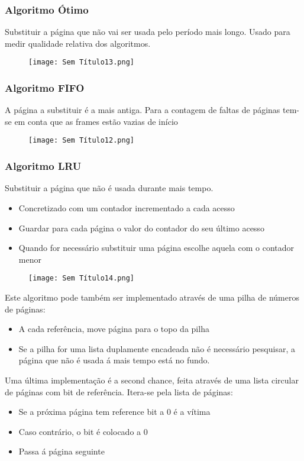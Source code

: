 \documentclass[10pt,a4paper]{report}
\begin{document}
\subsubsection{Algoritmo Ótimo}
Substituir a página que não vai ser usada pelo período mais longo. Usado para medir qualidade relativa dos algoritmos.
\begin{figure}[H]
\centering
\texttt{[image: Sem Título13.png]}
\end{figure}
\subsubsection{Algoritmo FIFO}
A página a substituir é a mais antiga. Para a contagem de faltas de páginas tem-se em conta que as frames estão vazias de início
\begin{figure}[H]
\centering
\texttt{[image: Sem Título12.png]}
\end{figure}
\subsubsection{Algoritmo LRU}
Substituir a página que não é usada durante mais tempo.
\begin{itemize}
\item Concretizado com um contador incrementado a cada acesso
\item Guardar para cada página o valor do contador do seu último acesso
\item Quando for necessário substituir uma página escolhe aquela com o contador menor
\end{itemize}
\begin{figure}[H]
\centering
\texttt{[image: Sem Título14.png]}
\end{figure}
Este algoritmo pode também ser implementado através de uma pilha de números de páginas:
\begin{itemize}
\item A cada referência, move página para o topo da pilha
\item Se a pilha for uma lista duplamente encadeada não é necessário pesquisar, a página que não é usada á mais tempo está no fundo.
\end{itemize}
Uma última implementação é a second chance, feita através de uma lista circular de páginas com bit de referência. Itera-se pela lista de páginas:
\begin{itemize}
\item Se a próxima página tem reference bit a 0 é a vítima
\item Caso contrário, o bit é colocado a 0
\item Passa á página seguinte
\end{itemize}
\end{document}
